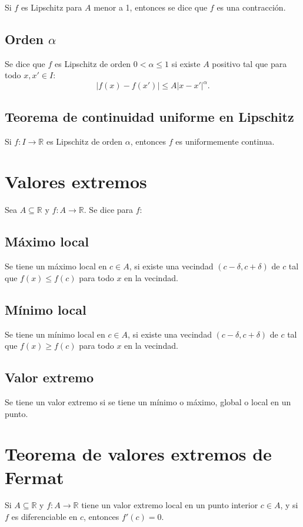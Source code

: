 \documentclass{article}
\begin{document}
Si $f$ es Lipschitz para $A$ menor a 1, entonces se dice que $f$ es una contracción.

\subsection*{Orden $\alpha$}

Se dice que $f$ es Lipschitz de orden $0<\alpha\leq 1$ si existe $A$ positivo tal que para todo $x,x'\in I$:
$$|f(x)-f(x')|\leq A|x-x'|^{\alpha}.$$

\subsection*{Teorema de continuidad uniforme en Lipschitz}

Si $f:I\to\mathbb{R}$ es Lipschitz de orden $\alpha$, entonces $f$ es uniformemente continua.	

\section*{Valores extremos}

Sea $A\subseteq \mathbb{R}$ y $f:A\to \mathbb{R}$. Se dice para $f$:

\subsection*{Máximo local}
Se tiene un máximo local en $c\in A$, si existe una vecindad $(c-\delta,c+\delta)$ de $c$ tal que $f(x)\leq f(c)$ para todo $x$ en la vecindad.

\subsection*{Mínimo local}
Se tiene un mínimo local en $c\in A$, si existe una vecindad $(c-\delta,c+\delta)$ de $c$ tal que $f(x)\geq f(c)$ para todo $x$ en la vecindad.

\subsection*{Valor extremo}
Se tiene un valor extremo si se tiene un mínimo o máximo, global o local en un punto.

\section*{Teorema de valores extremos de Fermat}

Si $A\subseteq \mathbb{R}$ y $f:A\to\mathbb{R}$ tiene un valor extremo local en un punto interior $c\in A$, y si $f$ es diferenciable en $c$, entonces $f'(c)=0$. 
\end{document}
